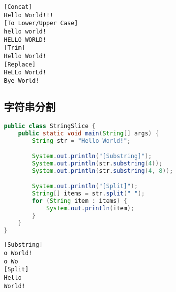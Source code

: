 \begin{tcolorbox}
	\begin{verbatim}
[Concat]
Hello World!!!
[To Lower/Upper Case]
hello world!
HELLO WORLD!
[Trim]
Hello World!
[Replace]
HeLLo WorLd!
Bye World!
	\end{verbatim}
\end{tcolorbox}

\vspace{0.5cm}

\subsection{字符串分割}

\begin{table}[H]
	\centering
\end{table}

\vspace{0.5cm}


\begin{lstlisting}[language=Java]
public class StringSlice {
	public static void main(String[] args) {
		String str = "Hello World!";

		System.out.println("[Substring]");
		System.out.println(str.substring(4));
		System.out.println(str.substring(4, 8));

		System.out.println("[Split]");
		String[] items = str.split(" ");
		for (String item : items) {
			System.out.println(item);
		}
	}
}
\end{lstlisting}

\begin{tcolorbox}
	\begin{verbatim}
[Substring]
o World!
o Wo
[Split]
Hello
World!
	\end{verbatim}
\end{tcolorbox}

\newpage